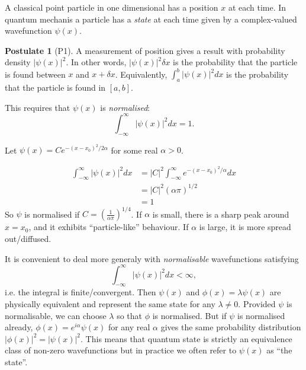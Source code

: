 \documentclass[a4paper]{article}
\theoremstyle{definition}
\newtheorem*{postulate}{Postulate}
\begin{document}
A classical point particle in one dimensional has a position $x$ at each time. In quantum mechanis a particle has a \emph{state} at each time given by a complex-valued wavefunction $\psi(x)$.

\begin{postulate}[P1]
  \label{postulate:1}
  A measurement of position gives a result with probability density $|\psi(x)|^2$. In other words, $|\psi(x)|^2 \delta x$ is the probability that the particle is found between $x$ and $x+\delta x$. Equivalently, $\int_a^b |\psi(x)|^2 dx$ is the probability that the particle is found in $[a,b]$.
\end{postulate}

This requires that $\psi(x)$ is \emph{normalised}:
\[
  \int_{-\infty}^\infty |\psi(x)|^2 dx = 1.
\]

\begin{eg}
  Let $\psi(x) = C e^{-(x-x_0)^2/2\alpha}$ for some real $\alpha>0$.
  \begin{center}
  \end{center}
  \begin{align*}
    \int_{-\infty}^\infty |\psi(x)|^2 dx &= |C|^2 \int_{-\infty}^\infty e^{-(x-x_0)^2/\alpha} dx \\
    &= |C|^2 (\alpha\pi)^{1/2} \\
    &= 1
  \end{align*}
  So $\psi$ is normalised if $C=(\frac{1}{\alpha\pi})^{1/4}$. If $\alpha$ is small, there is a sharp peak around $x=x_0$, and it exhibits ``particle-like'' behaviour. If $\alpha$ is large, it is more spread out/diffused.
\end{eg}

It is convenient to deal more generaly with \emph{normalisable} wavefunctions satisfying
\[
  \int_{-\infty}^\infty |\psi(x)|^2 dx < \infty,
\]
i.e. the integral is finite/convergent. Then $\psi(x)$ and $\phi(x) = \lambda\psi(x)$ are physically equivalent and represent the same state for any $\lambda\neq0$. Provided $\psi$ is normalisable, we can choose $\lambda$ so that $\phi$ is normalised. But if $\psi$ is normalised already, $\phi(x) = e^{i\alpha}\psi(x)$ for any real $\alpha$ gives the same probability distribution $|\phi(x)|^2 = |\psi(x)|^2$. This means that quantum state is strictly an equivalence class of non-zero wavefunctions but in practice we often refer to $\psi(x)$ as ``the state''.
\end{document}

